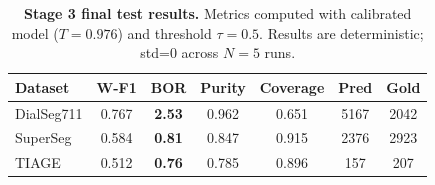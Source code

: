 \begin{table}[t]
\centering
\small
\begin{tabular}{lcccccc}
\toprule
Dataset & W-F1 & BOR & Purity & Coverage & Pred & Gold \\
\midrule
DialSeg711 & 0.767 & \textbf{2.53} & 0.962 & 0.651 & 5167 & 2042 \\
SuperSeg & 0.584 & \textbf{0.81} & 0.847 & 0.915 & 2376 & 2923 \\
TIAGE & 0.512 & \textbf{0.76} & 0.785 & 0.896 & 157 & 207 \\
\bottomrule
\end{tabular}
\caption{\textbf{Stage 3 final test results.}
Metrics computed with calibrated model ($T=0.976$) and threshold $\tau=0.5$.
Results are deterministic; std=0 across $N=5$ runs.}
\label{tab:stage3-variance}
\end{table}
